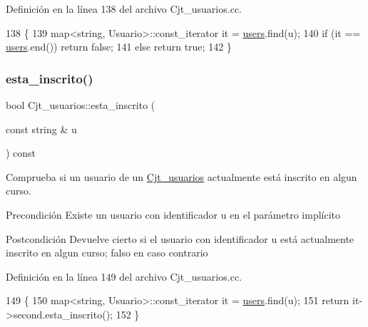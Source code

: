 Definición en la línea 138 del archivo Cjt\+\_\+usuarios.\+cc.


\begin{DoxyCode}
138                                                              \{
139         map<string, Usuario>::const\_iterator it = \mbox{\hyperlink{class_cjt__usuarios_a0b702ca0184d6fb2674cc827d39d5bff}{users}}.find(u);
140         \textcolor{keywordflow}{if} (it == \mbox{\hyperlink{class_cjt__usuarios_a0b702ca0184d6fb2674cc827d39d5bff}{users}}.end()) \textcolor{keywordflow}{return} \textcolor{keyword}{false};
141         \textcolor{keywordflow}{else} \textcolor{keywordflow}{return} \textcolor{keyword}{true};
142       \}
\end{DoxyCode}
\mbox{\label{class_cjt__usuarios_a514664eb81d17248016bfb782b466584}} 
\subsubsection{\texorpdfstring{esta\+\_\+inscrito()}{esta\_inscrito()}}
{\footnotesize\ttfamily bool Cjt\+\_\+usuarios\+::esta\+\_\+inscrito (\begin{DoxyParamCaption}\item[{const string \&}]{u }\end{DoxyParamCaption}) const}



Comprueba si un usuario de un \mbox{\hyperlink{class_cjt__usuarios}{Cjt\+\_\+usuarios}} actualmente está inscrito en algun curso. 

\begin{DoxyPrecond}{Precondición}
Existe un usuario con identificador u en el parámetro implícito 
\end{DoxyPrecond}
\begin{DoxyPostcond}{Postcondición}
Devuelve cierto si el usuario con identificador u está actualmente inscrito en algun curso; falso en caso contrario 
\end{DoxyPostcond}


Definición en la línea 149 del archivo Cjt\+\_\+usuarios.\+cc.


\begin{DoxyCode}
149                                                             \{
150         map<string, Usuario>::const\_iterator it = \mbox{\hyperlink{class_cjt__usuarios_a0b702ca0184d6fb2674cc827d39d5bff}{users}}.find(u);
151         \textcolor{keywordflow}{return} it->second.esta\_inscrito();
152       \}
\end{DoxyCode}
\mbox{\label{class_cjt__usuarios_a0a29517de316ac00a23f26df00ef779b}} 
